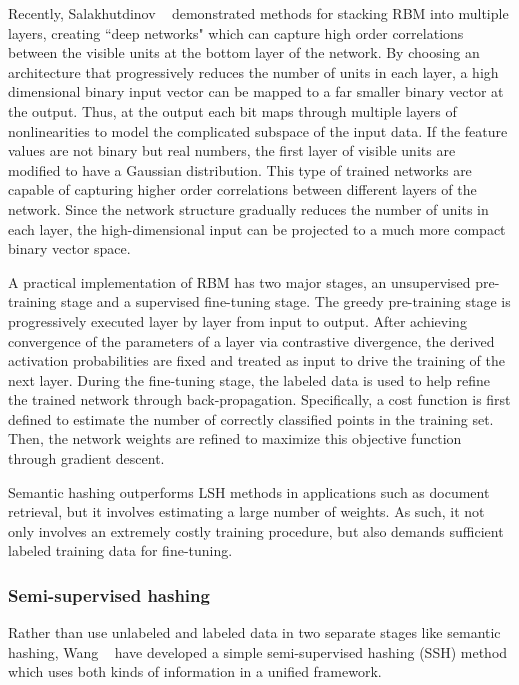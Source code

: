Recently, Salakhutdinov \etal~\cite{salakhutdinov2009aistats} demonstrated methods for stacking \mbox{RBM} into multiple layers, creating ``deep networks" which can capture high order correlations between the visible units at the bottom layer of the network. By choosing an architecture that progressively reduces the number of units in each layer, a high dimensional binary input vector can be mapped to a far smaller binary vector at the output. Thus, at the output each bit maps through multiple layers of nonlinearities to model the complicated subspace of the input data. If the feature values are not binary but real numbers, the first layer of visible units are modified to have a Gaussian distribution. This type of trained networks are capable of capturing higher order correlations between different layers of the network. Since the network structure gradually reduces the number of units in each layer, the high-dimensional input can be projected to a much more compact binary vector space.

A practical implementation of \mbox{RBM} has two major stages, an unsupervised pre-training stage and a supervised fine-tuning stage. The greedy pre-training stage is progressively executed layer by layer from input to output. After achieving convergence of the parameters of a layer via contrastive divergence, the derived activation probabilities are fixed and treated as input to drive the training of the next layer. During the fine-tuning stage, the labeled data is used to help refine the trained network through back-propagation. Specifically, a cost function is first defined to estimate the number of correctly classified points in the training set. Then, the network weights are refined to maximize this objective function through gradient descent. 

Semantic hashing outperforms \mbox{LSH} methods in applications such as document retrieval, but it involves estimating a large number of weights. As such, it not only involves an extremely costly training procedure, but also demands sufficient labeled training data for fine-tuning.

\subsubsection{Semi-supervised hashing}
Rather than use unlabeled and labeled data in two separate stages like semantic hashing, Wang \etal~\cite{wang2010cvpr} have developed a simple semi-supervised hashing (\mbox{SSH}) method which uses both kinds of information in a unified framework.

